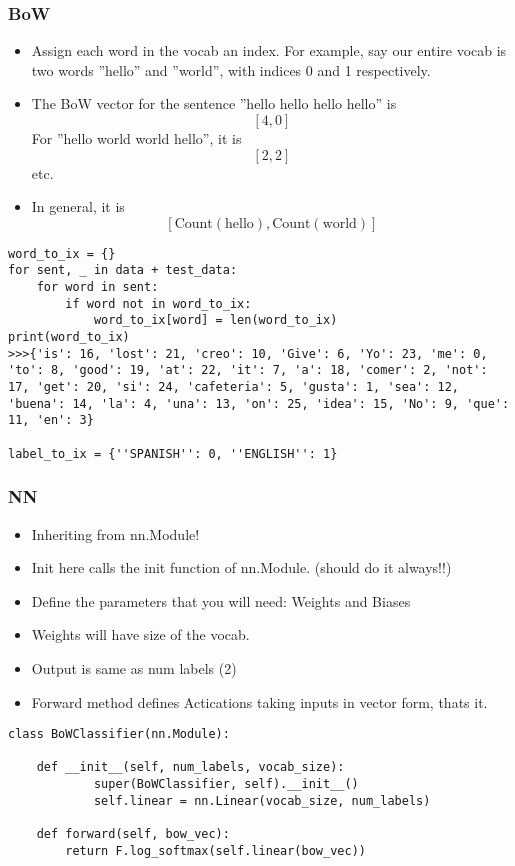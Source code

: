 \begin{frame}[fragile]
\frametitle{BoW}

\begin{itemize}
\item Assign each word in the vocab an index. For example, say our entire vocab is two words ''hello'' and ''world'', with indices 0 and 1 respectively.
\item The BoW vector for the sentence ''hello hello hello hello'' is $$ \left[ 4, 0 \right] $$ For ''hello world world hello'', it is $$ \left[ 2, 2 \right] $$ etc.
\item In general, it is  $$ \left[ \text{Count}(\text{hello}), \text{Count}(\text{world}) \right] $$
\end{itemize}
 \begin{lstlisting}
word_to_ix = {}
for sent, _ in data + test_data:
    for word in sent:
        if word not in word_to_ix:
            word_to_ix[word] = len(word_to_ix)
print(word_to_ix)
>>>{'is': 16, 'lost': 21, 'creo': 10, 'Give': 6, 'Yo': 23, 'me': 0, 'to': 8, 'good': 19, 'at': 22, 'it': 7, 'a': 18, 'comer': 2, 'not': 17, 'get': 20, 'si': 24, 'cafeteria': 5, 'gusta': 1, 'sea': 12, 'buena': 14, 'la': 4, 'una': 13, 'on': 25, 'idea': 15, 'No': 9, 'que': 11, 'en': 3}

label_to_ix = {''SPANISH'': 0, ''ENGLISH'': 1}
\end{lstlisting}              
\end{frame} 


\begin{frame}[fragile]
\frametitle{NN}

\begin{itemize}
\item Inheriting from nn.Module!
\item Init here calls the init function of nn.Module. (should do it always!!)
\item Define the parameters that you will need: Weights and Biases
\item Weights will have size of the vocab.
\item Output is same as num labels (2)
\item Forward method defines Actications taking inputs in vector form, thats it.
\end{itemize}
 \begin{lstlisting}
class BoWClassifier(nn.Module): 
    
    def __init__(self, num_labels, vocab_size):
    		super(BoWClassifier, self).__init__()
    		self.linear = nn.Linear(vocab_size, num_labels)

	def forward(self, bow_vec):
		return F.log_softmax(self.linear(bow_vec))
    
\end{lstlisting}              
\end{frame} 

